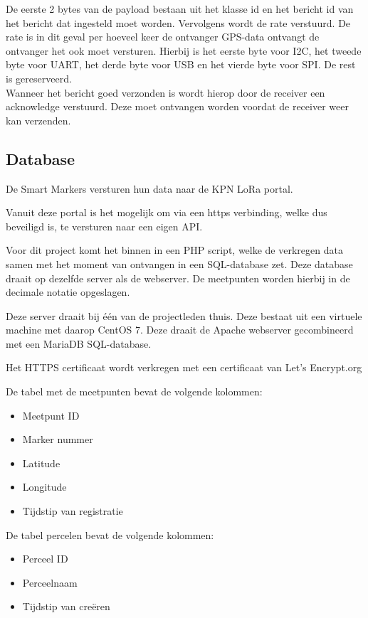 De eerste 2 bytes van de payload bestaan uit het klasse id en het bericht id van
het bericht dat ingesteld moet worden. Vervolgens wordt de rate verstuurd. De
rate is in dit geval per hoeveel keer de ontvanger GPS-data ontvangt de
ontvanger het ook moet versturen.
Hierbij is het eerste byte voor I2C, het tweede byte voor UART, het derde byte
voor USB en het vierde byte voor SPI. De rest is gereserveerd.
\citep[p. 11]{UBlox8}\\

Wanneer het bericht goed verzonden is wordt hierop door de receiver een
acknowledge verstuurd. Deze moet ontvangen worden voordat de receiver weer
kan verzenden.

\subsection{Database}
\label{sec:database}

De Smart Markers versturen hun data naar de KPN LoRa portal.

Vanuit deze portal is het mogelijk om via een https verbinding, welke dus beveiligd is,
te versturen naar een eigen API.

Voor dit project komt het binnen in een PHP script, welke de verkregen data samen met het
moment van ontvangen in een SQL-database zet. Deze database draait op dezelfde server als
de webserver. De meetpunten worden hierbij in de decimale notatie opgeslagen.

Deze server draait bij één van de projectleden thuis. Deze bestaat uit een virtuele
machine met daarop CentOS 7. Deze draait de Apache webserver gecombineerd met een
MariaDB SQL-database.

Het HTTPS certificaat wordt verkregen met een certificaat van Let's Encrypt.org

\newpage
De tabel met de meetpunten bevat de volgende kolommen:
\begin{itemize}
    \item Meetpunt ID
    \item Marker nummer
    \item Latitude
    \item Longitude
    \item Tijdstip van registratie
\end{itemize}

De tabel percelen bevat de volgende kolommen:
\begin{itemize}
    \item Perceel ID
    \item Perceelnaam
    \item Tijdstip van creëren
\end{itemize}

